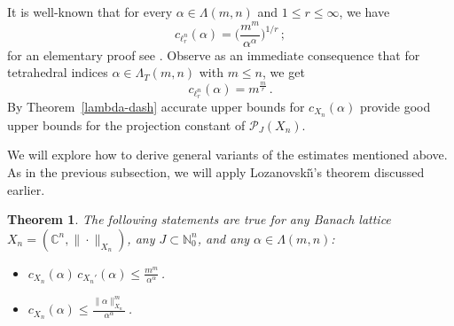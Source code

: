 \documentclass[12pt]{amsart}
\numberwithin{subsection}{section}
\newtheorem{theorem}{Theorem}[section]
\theoremstyle{definition}
\theoremstyle{remark}
\begin{document}
It is well-known that for every $\alpha \in \Lambda(m,n)$ and $1 \leq r \leq \infty$, we have
\begin{equation} \label{dineen}
c_{\ell_{r}^n}(\alpha) = \Big(\frac{m^m}{\alpha^\alpha}\Big)^{1/r}\,;
\end{equation}
for an  elementary proof see \cite[Lemma 1.38]{dineen1999complex}. Observe as an immediate consequence that for  tetrahedral indices
$\alpha \in \Lambda_T(m,n)$ with $m \leq n$, we get
\begin{equation} \label{dineen2}
c_{\ell_{r}^n}(\alpha) = m^{\frac{m}{r}}\,.
\end{equation}
By Theorem~\ref{lambda-dash} accurate upper bounds for $c_{X_n}(\alpha)$  provide good upper bounds for the
projection constant of $\mathcal{P}_J(X_n)$.

We will explore how to derive general variants of the estimates mentioned above. As in the previous subsection, we will apply
Lozanovski\v{\i}'s theorem discussed earlier.


\begin{theorem} \label{thm: bound for coef functional}
The following statements are true for any Banach lattice $X_n=(\mathbb{C}^n, \|\cdot\|_{X_n})$, any $J\subset \mathbb{N}_0^n$,
and any  $\alpha \in \Lambda(m,n)${\rm:}
\begin{itemize}
\item[(i)] $c_{X_n}(\alpha)\,c_{X_{n}'}(\alpha)  \leq \frac{m^m}{\alpha^{\alpha}}$\,.
\item[(ii)] $c_{X_n}(\alpha) \le \frac{\|\alpha\|^m_{X_n}}{\alpha^\alpha}$\,.
\end{itemize}
\end{theorem}
\end{document}
